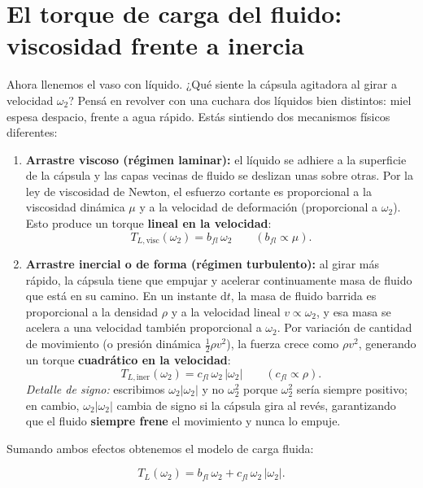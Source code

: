 \documentclass[11pt,a4paper,oneside]{book}
\newcommand{\dd}{\mathrm{d}}
\begin{document}
\section{El torque de carga del fluido: viscosidad frente a inercia}

Ahora llenemos el vaso con líquido. ¿Qué siente la cápsula agitadora al girar a
velocidad $\omega_2$? Pensá en revolver con una cuchara dos líquidos bien
distintos: miel espesa despacio, frente a agua rápido. Estás sintiendo dos
mecanismos físicos diferentes:

\begin{enumerate}
  \item \textbf{Arrastre viscoso (régimen laminar):} el líquido se adhiere a la
        superficie de la cápsula y las capas vecinas de fluido se deslizan unas
        sobre otras. Por la ley de viscosidad de Newton, el esfuerzo cortante es
        proporcional a la viscosidad dinámica $\mu$ y a la velocidad de
        deformación (proporcional a $\omega_2$). Esto produce un torque
        \textbf{lineal en la velocidad}:
        \[
          T_{L,\text{visc}}(\omega_2) = b_{fl}\,\omega_2 \qquad (b_{fl} \propto \mu).
        \]
  \item \textbf{Arrastre inercial o de forma (régimen turbulento):} al girar más
        rápido, la cápsula tiene que empujar y acelerar continuamente masa de
        fluido que está en su camino. En un instante $\dd t$, la masa de fluido
        barrida es proporcional a la densidad $\rho$ y a la velocidad lineal
        $v \propto \omega_2$, y esa masa se acelera a una velocidad también
        proporcional a $\omega_2$. Por variación de cantidad de movimiento (o
        presión dinámica $\frac{1}{2}\rho v^2$), la fuerza crece como $\rho v^2$,
        generando un torque \textbf{cuadrático en la velocidad}:
        \[
          T_{L,\text{iner}}(\omega_2) = c_{fl}\,\omega_2\,|\omega_2| \qquad (c_{fl} \propto \rho).
        \]
        \emph{Detalle de signo:} escribimos $\omega_2|\omega_2|$ y no $\omega_2^2$
        porque $\omega_2^2$ sería siempre positivo; en cambio, $\omega_2|\omega_2|$
        cambia de signo si la cápsula gira al revés, garantizando que el fluido
        \textbf{siempre frene} el movimiento y nunca lo empuje.
\end{enumerate}

Sumando ambos efectos obtenemos el modelo de carga fluida:
\begin{ecuacionclave}
\begin{equation}
  T_L(\omega_2) = b_{fl}\,\omega_2 + c_{fl}\,\omega_2\,|\omega_2|.
  \label{eq:carga_fluido}
\end{equation}
\end{ecuacionclave}
\end{document}
